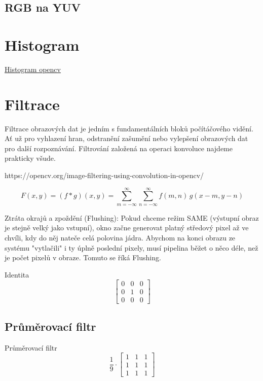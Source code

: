 \documentclass[FM,DP]{tulthesis}
\begin{document}
\subsection{RGB na YUV}

\section{Histogram}

\href{https://docs.opencv.org/3.4/d4/d1b/tutorial_histogram_equalization.html}{Histogram opencv}

\section{Filtrace}
Filtrace obrazových dat je jedním s fundamentálních bloků počítáčového vidění.
Ať už pro vyhlazení hran, odstranění zašumění nebo vylepšení obrazových dat pro
další rozpoznávání. Filtrování založená na operaci konvoluce najdeme prakticky
všude.

https://opencv.org/image-filtering-using-convolution-in-opencv/

\begin{equation}
    F(x,y)=(f * g)(x, y) = \sum_{m=-\infty}^{\infty} \sum_{n=-\infty}^{\infty} f(m, n)\, g(x - m, y - n)
    \label{eq:placeholder_label}
\end{equation}

Ztráta okrajů a zpoždění (Flushing): Pokud chceme režim SAME (výstupní obraz je
stejně velký jako vstupní), okno začne generovat platný středový pixel až ve
chvíli, kdy do něj nateče celá polovina jádra. Abychom na konci obrazu ze
systému "vytlačili" i ty úplně poslední pixely, musí pipelina běžet o něco
déle, než je počet pixelů v obraze. Tomuto se říká Flushing.

Identita
\begin{equation}
    \begin{bmatrix}
        0 & 0 & 0 \\
        0 & 1 & 0 \\
        0 & 0 & 0
    \end{bmatrix}
\end{equation}

\subsection{Průměrovací filtr}
Průměrovací filtr
\begin{equation}
    \frac{1}{9} \cdot
    \begin{bmatrix}
        1 & 1 & 1 \\
        1 & 1 & 1 \\
        1 & 1 & 1
    \end{bmatrix}
\end{equation}
\end{document}
